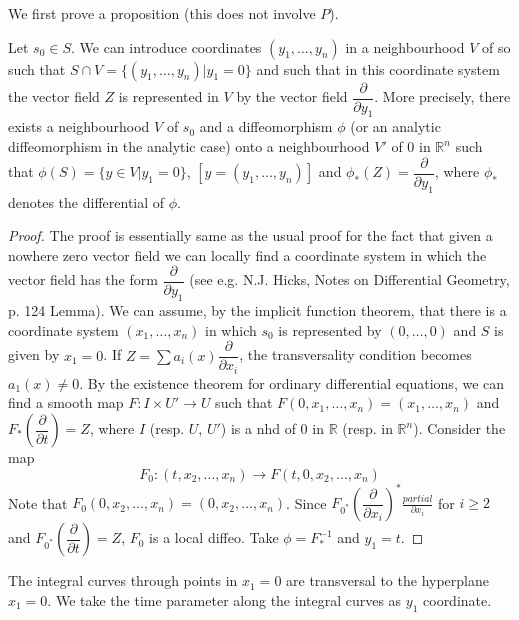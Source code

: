We first prove a proposition (this does not involve $P$).

\begin{prop*}
Let $s_{0}\in S$. We can introduce coordinates $(y_{1},\ldots,y_{n})$ in a neighbourhood $V$ of so such that $S\cap V=\{(y_{1},\ldots,y_{n})|y_{1}=0\}$ and such that in this coordinate system the vector field $Z$ is represented in $V$ by the vector field $\dfrac{\partial}{\partial y_{1}}$. More precisely, there exists a neighbourhood $V$ of $s_{0}$ and a diffeomorphism $\phi$ (or an analytic diffeomorphism in the analytic case) onto a neighbourhood $V'$ of $0$ in $\mathbb{R}^{n}$ such that $\phi(S)=\{y\in V|y_{1}=0\}$, $[y=(y_{1},\ldots,y_{n})]$ and $\phi_{*}(Z)=\dfrac{\partial}{\partial y_{1}}$, where $\phi_{*}$ denotes the differential of $\phi$.
\end{prop*}

\begin{proof}
The proof is essentially same as the usual proof for the fact that given a nowhere zero vector field we can locally find a coordinate system in which the vector field has the form $\dfrac{\partial}{\partial y_{1}}$ (see e.g. N.J. Hicks, Notes on Differential Geometry, p. 124 Lemma). We can assume, by the implicit function theorem, that there is a coordinate system $(x_{1},\ldots,x_{n})$ in which $s_{0}$ is represented by $(0,\ldots,0)$ and $S$ is given by $x_{1}=0$. If $Z=\sum a_{i}(x)\dfrac{\partial}{\partial x_{i}}$, the transversality condition becomes $a_{1}(x)\neq 0$. By the existence theorem for ordinary differential equations, we can find a smooth map $F:I\times U'\to U$ such that $F(0,x_{1},\ldots,x_{n})=(x_{1},\ldots,x_{n})$ and $F_{*}\left(\dfrac{\partial}{\partial t}\right)=Z$, where $I$ (resp. $U$, $U'$) is a nhd of 0 in $\mathbb{R}$ (resp. in $\mathbb{R}^{n}$). Consider the map 
$$
F_{0}:(t,x_{2},\ldots,x_{n})\to F(t,0,x_{2},\ldots,x_{n})
$$
Note that $F_{0}(0,x_{2},\ldots,x_{n})=(0,x_{2},\ldots,x_{n})$. Since $F_{0^{*}}\left(\dfrac{\partial}{\partial x_{i}}\right)^{*}\frac{partial}{\partial x_{i}}$ for $i\geq 2$ and $F_{0^{*}}\left(\dfrac{\partial}{\partial t}\right)=Z$, $F_{0}$ is a local diffeo. Take $\phi=F^{-1}_{*}$ and $y_{1}=t$.
\end{proof}

\begin{remark*}
The integral curves through points in $x_{1}=0$ are transversal to the hyperplane $x_{1}=0$. We take the time parameter along the integral curves as $y_{1}$ coordinate.
\end{remark*}

